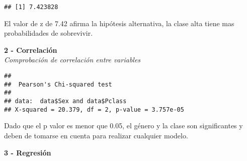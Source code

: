 \documentclass[]{article}
\newenvironment{Shaded}{\begin{snugshade}}{\end{snugshade}}
\newcommand{\KeywordTok}[1]{\textcolor[rgb]{0.13,0.29,0.53}{\textbf{#1}}}
\newcommand{\DecValTok}[1]{\textcolor[rgb]{0.00,0.00,0.81}{#1}}
\newcommand{\StringTok}[1]{\textcolor[rgb]{0.31,0.60,0.02}{#1}}
\newcommand{\CommentTok}[1]{\textcolor[rgb]{0.56,0.35,0.01}{\textit{#1}}}
\newcommand{\ControlFlowTok}[1]{\textcolor[rgb]{0.13,0.29,0.53}{\textbf{#1}}}
\newcommand{\OperatorTok}[1]{\textcolor[rgb]{0.81,0.36,0.00}{\textbf{#1}}}
\newcommand{\NormalTok}[1]{#1}
\begin{document}
\begin{Shaded}
\end{Shaded}

\begin{verbatim}
## [1] 7.423828
\end{verbatim}

El valor de z de 7.42 afirma la hipótesis alternativa, la clase alta
tiene mas probabilidades de sobrevivir.

\textbf{2 - Correlación}\\
\emph{Comprobación de correlación entre variables}

\begin{Shaded}
\end{Shaded}

\begin{verbatim}
## 
##  Pearson's Chi-squared test
## 
## data:  data$Sex and data$Pclass
## X-squared = 20.379, df = 2, p-value = 3.757e-05
\end{verbatim}

Dado que el p valor es menor que 0.05, el género y la clase son
significantes y deben de tomarse en cuenta para realizar cualquier
modelo.

\textbf{3 - Regresión}
\end{document}
